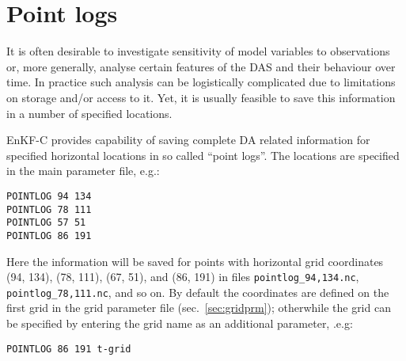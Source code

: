 \documentclass[11pt]{report}
\begin{document}
\section{Point logs}
\label{sec:pointlogs}

It is often desirable to investigate sensitivity of model variables to observations or, more generally,  analyse certain features of the DAS and their behaviour over time.
In practice such analysis can be logistically complicated due to limitations on storage and/or access to it.
Yet, it is usually feasible to save this information in a number of specified locations.

EnKF-C provides capability of saving complete DA related information for specified horizontal locations in so called ``point logs''.
The locations are specified in the main parameter file, e.g.:
\begin{Verbatim}
POINTLOG 94 134
POINTLOG 78 111
POINTLOG 57 51
POINTLOG 86 191
\end{Verbatim}
Here the information will be saved for points with horizontal grid coordinates (94, 134), (78, 111), (67, 51), and (86, 191) in files \verb|pointlog_94,134.nc|, \verb|pointlog_78,111.nc|, and so on.
By default the coordinates are defined on the first grid in the grid parameter file (sec.~\ref{sec:gridprm}); otherwhile the grid can be specified by entering the grid name as an additional parameter, .e.g:
\begin{Verbatim}
POINTLOG 86 191 t-grid
\end{Verbatim}
\end{document}
